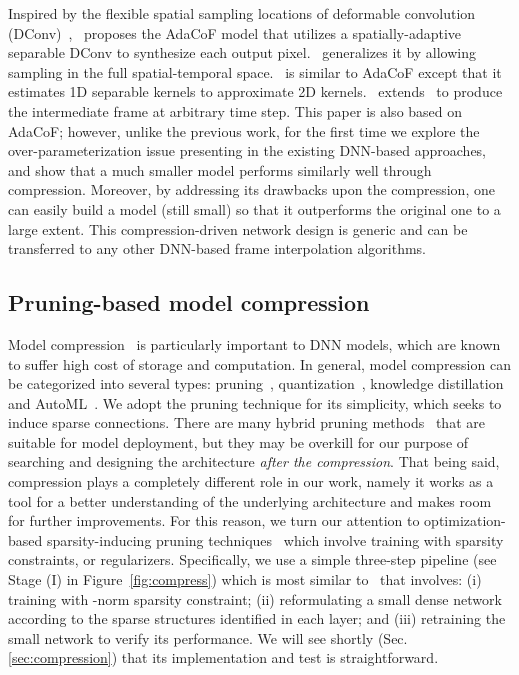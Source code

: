 \documentclass[final]{cvpr}
\begin{document}
Inspired by the flexible spatial sampling locations of deformable convolution (DConv)~\cite{dai2017deformable,zhu2019deformable}, \cite{lee2020adacof}~proposes the AdaCoF model that utilizes a spatially-adaptive separable DConv to synthesize each output pixel. \cite{shi2020video}~generalizes it by allowing sampling in the full spatial-temporal space. \cite{cheng2020video}~is similar to AdaCoF except that it estimates 1D separable kernels to approximate 2D kernels. \cite{cheng2020multiple}~extends~\cite{cheng2020video} to produce the intermediate frame at arbitrary time step. This paper is also based on AdaCoF; however, unlike the previous work, for the first time we explore the over-parameterization issue presenting in the existing DNN-based approaches, and show that a much smaller model performs similarly well through compression. Moreover, by addressing its drawbacks upon the compression, one can easily build a model (still small) so that it outperforms the original one to a large extent. This compression-driven network design  is generic and can be transferred to any other DNN-based frame interpolation algorithms.




\subsection{Pruning-based model compression}

Model compression~\cite{bucilu2006model,cheng2017survey} is particularly important to DNN models, which are known to suffer high cost of storage and computation. In general, model compression can be categorized into several types: pruning~\cite{zhu2017prune}, quantization~\cite{polino2018model}, knowledge distillation~\cite{hinton2015distilling} and AutoML~\cite{he2018amc}. We adopt the pruning technique for its simplicity, which seeks to induce sparse connections. There are many hybrid pruning methods~\cite{chen2015compressing,han2015deep,ullrich2017soft} that are suitable for model deployment,
but they may be overkill for our purpose of searching and designing the architecture \emph{after the compression}. That being said,  compression plays a completely different role in our work, namely it works as a tool for a better understanding of the underlying architecture and makes room for further improvements. For this reason, we turn our attention to optimization-based sparsity-inducing pruning techniques~\cite{lebedev2016fast,li2016pruning,wen2016learning,zhou2016less} which involve training with sparsity constraints, \eg  or  regularizers. Specifically, we use a simple three-step pipeline (see Stage (I) in Figure~\ref{fig:compress}) which is most similar to~\cite{chen2020neural,han2015learning} that involves: (i) training with -norm sparsity constraint; (ii) reformulating a small dense network according to the sparse structures identified in each layer; and (iii) retraining the small network to verify its performance. We will see shortly (Sec. \ref{sec:compression}) that its implementation and test is straightforward.
\end{document}
